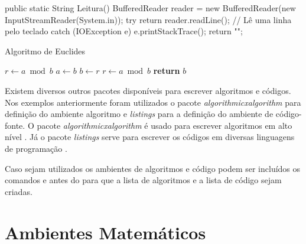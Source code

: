 \begin{codigo}[caption={Subrotina para obter uma entrada do usuário}, label={codigo:metodo_leitura}, language=Java, breaklines=true]
public static String Leitura(){
    BufferedReader reader = new BufferedReader(new InputStreamReader(System.in));
    try {
        return reader.readLine(); // Lê uma linha pelo teclado
    } catch (IOException e) {
        e.printStackTrace();
        return "";
    }
}
\end{codigo}

\begin{algoritmo}
\caption{Algoritmo de Euclides}\label{algoritmo:euclidalgoritmo:mdc1}
\begin{algorithmic}[1]
\State $r\gets a\bmod b$
\State $a\gets b$
\State $b\gets r$
\State $r\gets a\bmod b$
\EndWhile\label{euclidendwhile}
\State \Return\textbf{return} $b$
\EndProcedure
\end{algorithmic}
\end{algoritmo}

Existem diversos outros pacotes disponíveis para escrever algoritmos e códigos. Nos exemplos anteriormente foram utilizados o pacote \textit{algorithmicxalgorithm} para definição do ambiente algoritmo e \textit{listings} para a definição do ambiente de código-fonte. O pacote \textit{algorithmicxalgorithm} é usado para escrever algoritmos em alto nível \cite{janos:2005:algpseudocode}. Já o pacote \textit{listings} serve para escrever os códigos em diversas linguagens de programação \cite{moses:2006:listings}.

Caso sejam utilizados os ambientes de algoritmos e código podem ser incluídos os comandos  e  antes do  para que a lista de algoritmos e a lista de código sejam criadas.


\section{Ambientes Matemáticos}

